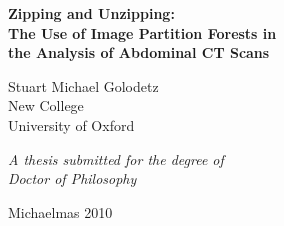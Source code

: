 \begin{titlepage}

\begin{center}

\vspace*{1cm}

\LARGE \textbf{Zipping and Unzipping:\\The Use of Image Partition Forests in\\the Analysis of Abdominal CT Scans}\\

\vspace{1cm}


\vspace{2mm}

\large Stuart Michael Golodetz\\
\normalsize New College \\
\normalsize University of Oxford

\vspace{2.5cm}

\textit{A thesis submitted for the degree of\\Doctor of Philosophy}

\vspace{2mm}

Michaelmas 2010

\end{center}

\end{titlepage}
